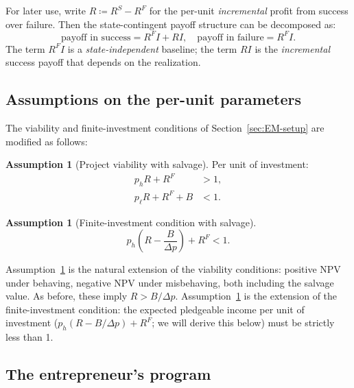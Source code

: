 \documentclass[11pt,a4paper,oneside]{book}
\theoremstyle{plain}
\theoremstyle{definition}
\newtheorem{assumption}[theorem]{Assumption}
\theoremstyle{remark}
\numberwithin{equation}{chapter}
\begin{document}
For later use, write $R \coloneqq R^S - R^F$ for the per-unit \emph{incremental} profit from success over failure.
Then the state-contingent payoff structure can be decomposed as:
\begin{equation}\label{eq:EM-decomposition}
  \text{payoff in success} = R^F I + R I, \quad \text{payoff in failure} = R^F I.
\end{equation}
The term $R^F I$ is a \emph{state-independent} baseline; the term $R I$ is the \emph{incremental} success payoff that depends on the realization.

\subsection{Assumptions on the per-unit parameters}

The viability and finite-investment conditions of Section~\ref{sec:EM-setup} are modified as follows:

\begin{assumption}[Project viability with salvage]\label{ass:EM-collateral-viability}
Per unit of investment:
\begin{align}
  p_h R + R^F &> 1, \tag{V.1''}\label{eq:EM-col-NPV-h} \\
  p_\ell R + R^F + B &< 1. \tag{V.2''}\label{eq:EM-col-NPV-l}
\end{align}
\end{assumption}

\begin{assumption}[Finite-investment condition with salvage]\label{ass:EM-collateral-finite}
\begin{equation}\label{eq:EM-col-finite}
  p_h \left( R - \frac{B}{\Delta p} \right) + R^F < 1.
\end{equation}
\end{assumption}

Assumption~\ref{ass:EM-collateral-viability} is the natural extension of the viability conditions: positive NPV under behaving, negative NPV under misbehaving, both including the salvage value.
As before, these imply $R > B/\Delta p$.
Assumption~\ref{ass:EM-collateral-finite} is the extension of the finite-investment condition: the expected pledgeable income per unit of investment ($p_h(R - B/\Delta p) + R^F$; we will derive this below) must be strictly less than 1.

\subsection{The entrepreneur's program}
\end{document}
